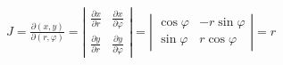 \documentclass[preview]{standalone}
\begin{document}
\begin{align*}
J = \frac{\partial(x, y)}{\partial(r, \varphi)} = \left| \begin{array}{cc} \frac{\partial x}{\partial r} & \frac{\partial x}{\partial \varphi} \\ \frac{\partial y}{\partial r} & \frac{\partial y}{\partial \varphi} \end{array} \right| = \left| \begin{array}{cc} \cos\varphi & -r\sin\varphi \\ \sin\varphi & r\cos\varphi \end{array} \right| = r
\end{align*}
\end{document}
